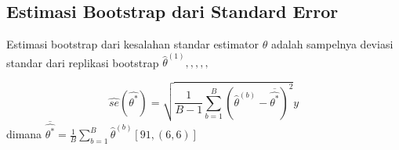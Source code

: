 \documentclass[a4paper,12pt]{article}
\theoremstyle{definition}
\begin{document}
\subsection{Estimasi Bootstrap dari Standard Error}
Estimasi bootstrap dari kesalahan standar estimator $\widehat{\theta }$ adalah sampelnya deviasi standar dari replikasi bootstrap $\widehat{\theta }^{\left ( 1 \right )},,,,,$




\begin{equation}
    \widehat{se}\left ( \widehat{\theta ^{*}} \right )=\sqrt{\frac{1}{B-1}\sum_{b=1}^{B}\left ( \widehat{\theta } ^{\left ( b \right )}-\overline{\widehat{\theta^{*} }}\right )^{2}}y
\end{equation}
dimana $\overline{\widehat{\theta ^{*}}}=\frac{1}{B}\sum_{b=1}^{B}\widehat{\theta}^{(b)}\left [ 91,(6,6) \right ]$
\end{document}
